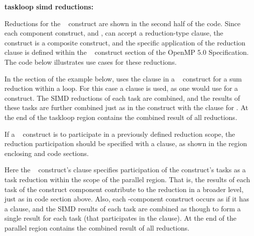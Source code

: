 \textbf{taskloop simd reductions:}

Reductions for the ~ construct are shown in the second half of the code.
Since each component construct,  and , 
can accept a reduction-type clause, the ~ construct
is a composite construct, and the specific application of the reduction clause is defined
within the ~ construct section of the OpenMP 5.0 Specification.
The code below illustrates use cases for these reductions.

In the  section of the example below,
 uses the  clause 
in a ~ construct for a sum reduction within a loop.
For this case a  clause is used, as one would use 
for a  construct.
The SIMD reductions of each task are combined, and the results of these tasks are further 
combined just as in the  construct with the  clause for .
At the end of the taskloop region  contains the combined result of all reductions.

If a ~ construct is to participate in a previously defined 
reduction scope, the reduction participation should be specified with
a  clause, as shown in the  region enclosing
 and  code sections.  

Here the ~ construct's 
 clause specifies participation of the construct's tasks as 
a task reduction within the scope of the parallel region.  
That is, the results of each task of the  construct component 
contribute to the reduction in a broader level, just as in  code section above.
Also, each -component construct
occurs as if it has a  clause, and the
SIMD results of each task are combined as though to form a single result for
each task (that participates in the  clause).
At the end of the parallel region  contains the combined result of all reductions.







